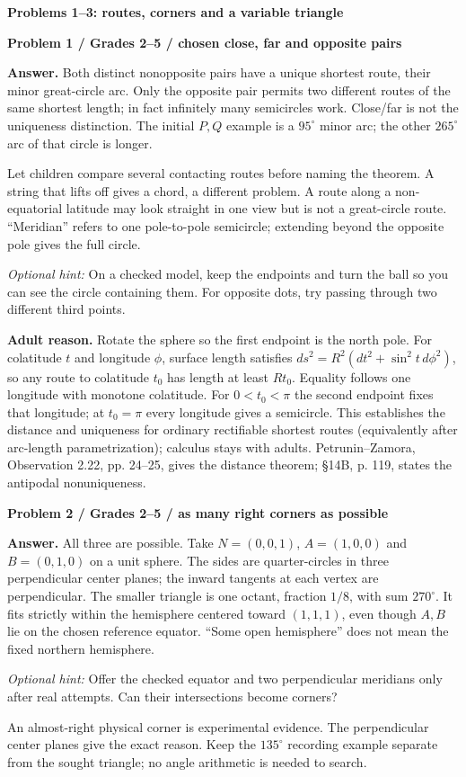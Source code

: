 \documentclass[11pt,letterpaper]{article}
\newcommand{\topic}[1]{\par{\large\bfseries\color{blue}#1}\par}
\newcommand{\sub}[1]{\par\textbf{#1}\par}
\newcommand{\hint}[1]{\textit{Optional hint:} #1\par}
\newcommand{\degc}{^\circ}
\begin{document}
\newpage
\topic{Problems 1--3: routes, corners and a variable triangle}
\sub{Problem 1 / Grades 2--5 / chosen close, far and opposite pairs}
\textbf{Answer.} Both distinct nonopposite pairs have a unique shortest route, their minor great-circle arc. Only the opposite pair permits two different routes of the same shortest length; in fact infinitely many semicircles work. Close/far is not the uniqueness distinction. The initial $P,Q$ example is a $95\degc$ minor arc; the other $265\degc$ arc of that circle is longer.

Let children compare several contacting routes before naming the theorem. A string that lifts off gives a chord, a different problem. A route along a non-equatorial latitude may look straight in one view but is not a great-circle route. ``Meridian'' refers to one pole-to-pole semicircle; extending beyond the opposite pole gives the full circle.

\hint{On a checked model, keep the endpoints and turn the ball so you can see the circle containing them. For opposite dots, try passing through two different third points.}
\textbf{Adult reason.} Rotate the sphere so the first endpoint is the north pole. For colatitude $t$ and longitude $\phi$, surface length satisfies $ds^2=R^2(dt^2+\sin^2t\,d\phi^2)$, so any route to colatitude $t_0$ has length at least $Rt_0$. Equality follows one longitude with monotone colatitude. For $0<t_0<\pi$ the second endpoint fixes that longitude; at $t_0=\pi$ every longitude gives a semicircle. This establishes the distance and uniqueness for ordinary rectifiable shortest routes (equivalently after arc-length parametrization); calculus stays with adults. Petrunin--Zamora, Observation 2.22, pp. 24--25, gives the distance theorem; \S14B, p. 119, states the antipodal nonuniqueness.

\sub{Problem 2 / Grades 2--5 / as many right corners as possible}
\textbf{Answer.} All three are possible. Take $N=(0,0,1)$, $A=(1,0,0)$ and $B=(0,1,0)$ on a unit sphere. The sides are quarter-circles in three perpendicular center planes; the inward tangents at each vertex are perpendicular. The smaller triangle is one octant, fraction $1/8$, with sum $270\degc$. It fits strictly within the hemisphere centered toward $(1,1,1)$, even though $A,B$ lie on the chosen reference equator. ``Some open hemisphere'' does not mean the fixed northern hemisphere.

\hint{Offer the checked equator and two perpendicular meridians only after real attempts. Can their intersections become corners?}
An almost-right physical corner is experimental evidence. The perpendicular center planes give the exact reason. Keep the $135\degc$ recording example separate from the sought triangle; no angle arithmetic is needed to search.
\end{document}
